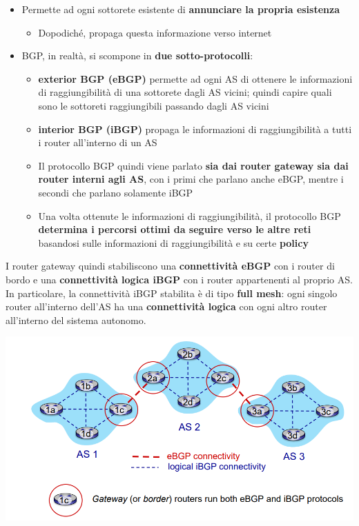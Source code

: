 \documentclass[12pt]{article}
\begin{document}
\begin{itemize}
    \item Permette ad ogni sottorete esistente di \textbf{annunciare la propria esistenza}
    \begin{itemize}
        \item Dopodiché, propaga questa informazione verso internet
    \end{itemize}
    \item BGP, in realtà, si scompone in \textbf{due sotto-protocolli}:
    \begin{itemize}
        \item \textbf{exterior BGP (eBGP)} permette ad ogni AS di ottenere le informazioni di raggiungibilità di una sottorete dagli AS vicini; quindi capire quali sono le sottoreti raggiungibili passando dagli AS vicini
        \item \textbf{interior BGP (iBGP)} propaga le informazioni di raggiungibilità a tutti i router all'interno di un AS
        \item Il protocollo BGP quindi viene parlato \textbf{sia dai router gateway sia dai router interni agli AS}, con i primi che parlano anche eBGP, mentre i secondi che parlano solamente iBGP
        \item Una volta ottenute le informazioni di raggiungibilità, il protocollo BGP \textbf{determina i percorsi ottimi da seguire verso le altre reti} basandosi sulle informazioni di raggiungibilità e su certe \textbf{policy}
    \end{itemize}
\end{itemize}
I router gateway quindi stabiliscono una \textbf{connettività eBGP} con i router di bordo e una \textbf{connettività logica iBGP} con i router appartenenti al proprio AS.
In particolare, la connettività iBGP stabilita è di tipo \textbf{full mesh}: ogni singolo router all'interno dell'AS ha una \textbf{connettività logica} con ogni altro router all'interno del sistema autonomo.
\begin{center}
    \includegraphics[width =0.80\linewidth]{Images/114.png}
\end{center}
\end{document}
